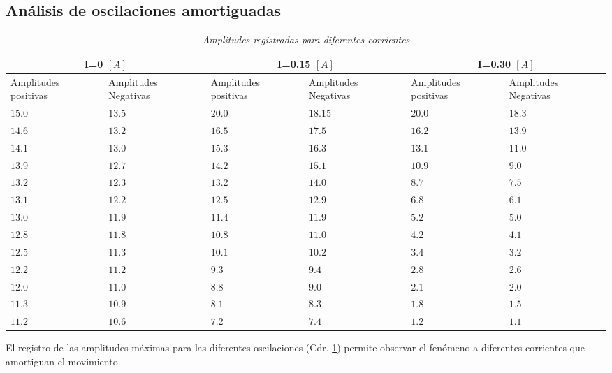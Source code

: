 \documentclass[spanish,notitlepage,letterpaper, 12pt]{article}
\begin{document}
\subsection{Análisis de oscilaciones amortiguadas}
\begin{table}[ht]
    \centering
    \begin{tabular}{|m{2cm}|m{2cm}|m{2cm}|m{2cm}|m{2cm}|m{2cm}|}
        \hline
        \multicolumn{2}{|c|}{I=0 $[A]$} & \multicolumn{2}{|c|}{I=0.15 $[A]$} & \multicolumn{2}{|c|}{I=0.30 $[A]$}\\
        \hline \hline
        Amplitudes positivas&Amplitudes Negativas&  Amplitudes positivas& Amplitudes Negativas& Amplitudes positivas& Amplitudes Negativas\\
        \hline
        $15.0$ & $13.5$ & $20.0$ & $18.15$ & $20.0$ & $18.3$\\
        $14.6$ & $13.2$ & $16.5$ & $17.5$ & $16.2$ & $13.9$\\
        $14.1$ & $13.0$ & $15.3$ & $16.3$ & $13.1$ & $11.0$\\
        $13.9$ & $12.7$ & $14.2$ & $15.1$ & $10.9$ & $9.0$\\
        $13.2$ & $12.3$ & $13.2$ & $14.0$ & $8.7$ & $7.5$\\
        $13.1$ & $12.2$ & $12.5$ & $12.9$ & $6.8$ & $6.1$\\
        $13.0$ & $11.9$ & $11.4$ & $11.9$ & $5.2$ & $5.0$\\
        $12.8$ & $11.8$ & $10.8$ & $11.0$ & $4.2$ & $4.1$\\ 
        $12.5$ & $11.3$ & $10.1$ & $10.2$ & $3.4$ & $3.2$\\ 
        $12.2$ & $11.2$ & $9.3$ & $9.4$ & $2.8$ & $2.6$\\ 
        $12.0$ & $11.0$ & $8.8$ & $9.0$ & $2.1$ & $2.0$\\ 
        $11.3$ & $10.9$ & $8.1$ & $8.3$ & $1.8$ & $1.5$\\ 
        $11.2$ & $10.6$ & $7.2$ & $7.4$ & $1.2$ & $1.1$\\
        \hline
    \end{tabular}
    \caption{\textit{Amplitudes registradas para diferentes corrientes}}
    \label{Table 1}
\end{table}
El registro de las amplitudes máximas para las diferentes oscilaciones (Cdr. \ref{Table 1}) permite observar el fenómeno a diferentes corrientes que amortiguan el movimiento.
\end{document}
